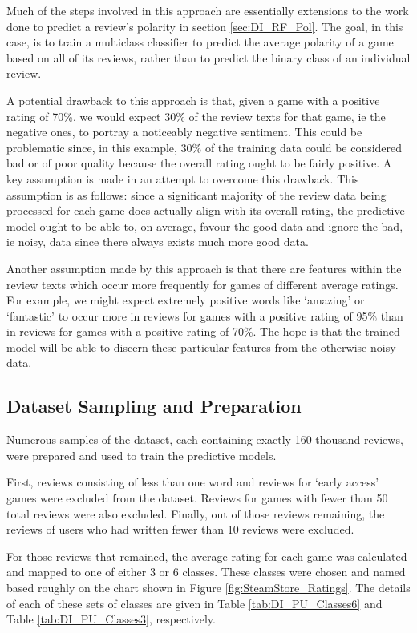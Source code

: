 Much of the steps involved in this approach are essentially extensions to the work done to predict a review's polarity in section \ref{sec:DI_RF_Pol}. The goal, in this case, is to train a multiclass classifier to predict the average polarity of a game based on all of its reviews, rather than to predict the binary class of an individual review.

A potential drawback to this approach is that, given a game with a positive rating of 70\%, we would expect 30\% of the review texts for that game, ie the negative ones, to portray a noticeably negative sentiment. This could be problematic since, in this example, 30\% of the training data could be considered bad or of poor quality because the overall rating ought to be fairly positive. A key assumption is made in an attempt to overcome this drawback. This assumption is as follows: since a significant majority of the review data being processed for each game does actually align with its overall rating, the predictive model ought to be able to, on average, favour the good data and ignore the bad, ie noisy, data since there always exists much more good data.

Another assumption made by this approach is that there are features within the review texts which occur more frequently for games of different average ratings. For example, we might expect extremely positive words like `amazing' or `fantastic' to occur more in reviews for games with a positive rating of 95\% than in reviews for games with a positive rating of 70\%. The hope is that the trained model will be able to discern these particular features from the otherwise noisy data.

\subsection{Dataset Sampling and Preparation}

Numerous samples of the dataset, each containing exactly 160 thousand reviews, were prepared and used to train the predictive models.

First, reviews consisting of less than one word and reviews for `early access' games were excluded from the dataset. Reviews for games with fewer than 50 total reviews were also excluded. Finally, out of those reviews remaining, the reviews of users who had written fewer than 10 reviews were excluded.

For those reviews that remained, the average rating for each game was calculated and mapped to one of either 3 or 6 classes. These classes were chosen and named based roughly on the chart shown in Figure \ref{fig:SteamStore_Ratings}. The details of each of these sets of classes are given in Table \ref{tab:DI_PU_Classes6} and Table \ref{tab:DI_PU_Classes3}, respectively.

